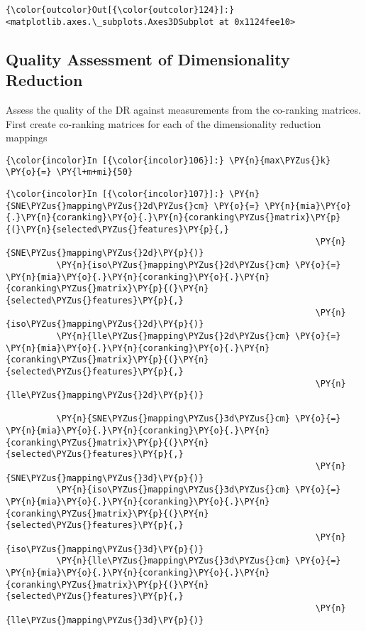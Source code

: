             \begin{Verbatim}[commandchars=\\\{\}]
{\color{outcolor}Out[{\color{outcolor}124}]:} <matplotlib.axes.\_subplots.Axes3DSubplot at 0x1124fee10>
\end{Verbatim}

    \subsection{Quality Assessment of Dimensionality
Reduction}\label{quality-assessment-of-dimensionality-reduction}

    Assess the quality of the DR against measurements from the co-ranking
matrices. First create co-ranking matrices for each of the
dimensionality reduction mappings

    \begin{Verbatim}[commandchars=\\\{\}]
{\color{incolor}In [{\color{incolor}106}]:} \PY{n}{max\PYZus{}k} \PY{o}{=} \PY{l+m+mi}{50}
\end{Verbatim}

    \begin{Verbatim}[commandchars=\\\{\}]
{\color{incolor}In [{\color{incolor}107}]:} \PY{n}{SNE\PYZus{}mapping\PYZus{}2d\PYZus{}cm} \PY{o}{=} \PY{n}{mia}\PY{o}{.}\PY{n}{coranking}\PY{o}{.}\PY{n}{coranking\PYZus{}matrix}\PY{p}{(}\PY{n}{selected\PYZus{}features}\PY{p}{,}
                                                             \PY{n}{SNE\PYZus{}mapping\PYZus{}2d}\PY{p}{)}
          \PY{n}{iso\PYZus{}mapping\PYZus{}2d\PYZus{}cm} \PY{o}{=} \PY{n}{mia}\PY{o}{.}\PY{n}{coranking}\PY{o}{.}\PY{n}{coranking\PYZus{}matrix}\PY{p}{(}\PY{n}{selected\PYZus{}features}\PY{p}{,}
                                                             \PY{n}{iso\PYZus{}mapping\PYZus{}2d}\PY{p}{)}
          \PY{n}{lle\PYZus{}mapping\PYZus{}2d\PYZus{}cm} \PY{o}{=} \PY{n}{mia}\PY{o}{.}\PY{n}{coranking}\PY{o}{.}\PY{n}{coranking\PYZus{}matrix}\PY{p}{(}\PY{n}{selected\PYZus{}features}\PY{p}{,}
                                                             \PY{n}{lle\PYZus{}mapping\PYZus{}2d}\PY{p}{)}

          \PY{n}{SNE\PYZus{}mapping\PYZus{}3d\PYZus{}cm} \PY{o}{=} \PY{n}{mia}\PY{o}{.}\PY{n}{coranking}\PY{o}{.}\PY{n}{coranking\PYZus{}matrix}\PY{p}{(}\PY{n}{selected\PYZus{}features}\PY{p}{,}
                                                             \PY{n}{SNE\PYZus{}mapping\PYZus{}3d}\PY{p}{)}
          \PY{n}{iso\PYZus{}mapping\PYZus{}3d\PYZus{}cm} \PY{o}{=} \PY{n}{mia}\PY{o}{.}\PY{n}{coranking}\PY{o}{.}\PY{n}{coranking\PYZus{}matrix}\PY{p}{(}\PY{n}{selected\PYZus{}features}\PY{p}{,}
                                                             \PY{n}{iso\PYZus{}mapping\PYZus{}3d}\PY{p}{)}
          \PY{n}{lle\PYZus{}mapping\PYZus{}3d\PYZus{}cm} \PY{o}{=} \PY{n}{mia}\PY{o}{.}\PY{n}{coranking}\PY{o}{.}\PY{n}{coranking\PYZus{}matrix}\PY{p}{(}\PY{n}{selected\PYZus{}features}\PY{p}{,}
                                                             \PY{n}{lle\PYZus{}mapping\PYZus{}3d}\PY{p}{)}
\end{Verbatim}

